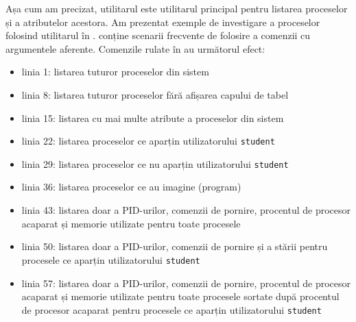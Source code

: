 Așa cum am precizat, utilitarul  este utilitarul principal pentru listarea
proceselor și a atributelor acestora. Am prezentat exemple de investigare a proceselor folosind utilitarul  în .  conține scenarii frecvente de folosire a comenzii  cu argumentele aferente. Comenzile rulate în  au următorul efect:
\begin{itemize}
	\item linia 1: listarea tuturor proceselor din sistem
	\item linia 8: listarea tuturor proceselor fără afișarea capului de tabel
	\item linia 15: listarea cu mai multe atribute a proceselor din sistem
        \item linia 22: listarea proceselor ce aparțin utilizatorului \texttt{student}
        \item linia 29: listarea proceselor ce nu aparțin utilizatorului \texttt{student}
        \item linia 36: listarea proceselor ce au imagine (program) 
	\item linia 43: listarea doar a PID-urilor, comenzii de pornire, procentul de
		procesor acaparat și memorie utilizate pentru toate procesele
	\item linia 50: listarea doar a PID-urilor, comenzii de pornire și a stării pentru
          procesele ce aparțin utilizatorului \texttt{student}
	\item linia 57: listarea doar a PID-urilor, comenzii de pornire, procentul de
		procesor acaparat și memorie utilizate pentru toate procesele
                sortate după procentul de procesor acaparat pentru procesele ce aparțin utilizatorului \texttt{student}
\end{itemize}


